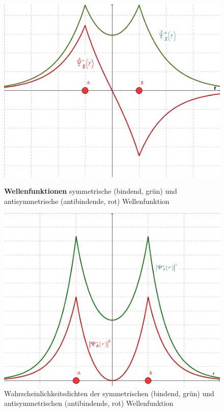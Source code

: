 \label{q:42}
\begin{figure}[H]
    \centering
   \begin{minipage}[b]{.4\linewidth} %
      \includegraphics[width=\linewidth]{resources/16-03-2012/sym_und_antisymm_Wellenfunktion.jpeg}
      \caption{\textbf{Wellenfunktionen} symmetrische (bindend, grün) und antisymmetrische (antibindende, rot) Wellenfunktion}
   \end{minipage}
   \hspace{.1\linewidth}%
   \begin{minipage}[b]{.4\linewidth} %
      \includegraphics[width=\linewidth]{resources/16-03-2012/Wahrscheinlichkeitsdichten.jpeg}
      \caption{Wahrscheinlichkeitsdichten der symmetrischen (bindend, grün) und antisymmetrischen (antibindende, rot) Wellenfunktion}
   \end{minipage}
\end{figure}
